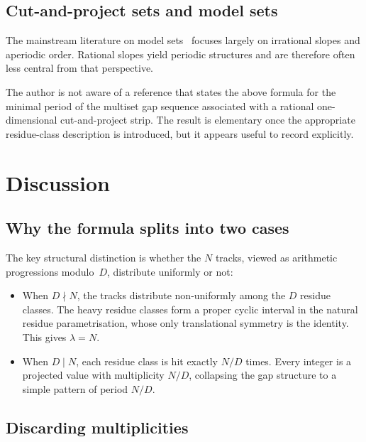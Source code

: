 \documentclass[11pt]{article}
\theoremstyle{plain}
\theoremstyle{definition}
\theoremstyle{remark}
\begin{document}
\subsection{Cut-and-project sets and model sets}

The mainstream literature on model sets~\cite{Senechal2009, Meyer1972,
HaynesEtAl2016} focuses largely on irrational slopes and aperiodic order.
Rational slopes yield periodic structures and are therefore often less
central from that perspective.

The author is not aware of a reference that states the above formula for the
minimal period of the multiset gap sequence associated with a rational
one-dimensional cut-and-project strip.  The result is elementary once the
appropriate residue-class description is introduced, but it appears useful to
record explicitly.

\section{Discussion}\label{sec:discussion}

\subsection{Why the formula splits into two cases}

The key structural distinction is whether the \(N\) tracks, viewed as
arithmetic progressions modulo~\(D\), distribute uniformly or not:
\begin{itemize}
    \item When \(D \nmid N\), the tracks distribute non-uniformly among the
          \(D\) residue classes.  The heavy residue classes form a proper
          cyclic interval in the natural residue parametrisation, whose only
          translational symmetry is the identity.  This gives
          \(\lambda = N\).
    \item When \(D \mid N\), each residue class is hit exactly \(N/D\) times.
          Every integer is a projected value with multiplicity \(N/D\),
          collapsing the gap structure to a simple pattern of period \(N/D\).
\end{itemize}

\subsection{Discarding multiplicities}\label{subsec:discarding}
\end{document}
